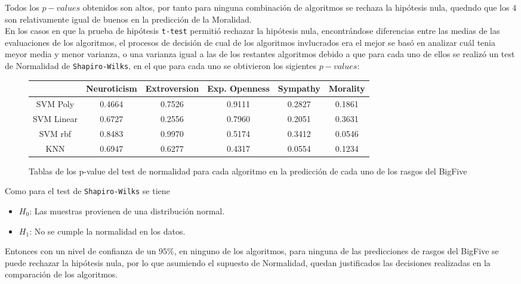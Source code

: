 \documentclass[10pt, a4paper]{article}
\begin{document}
    Todos los $p-values$ obtenidos son altos, por tanto para ninguna combinaci\'on de algoritmos se rechaza la hip\'otesis nula, quedndo 
    que los $4$ son relativamente igual de buenos en la predicci\'on de la Moralidad.\\

    En los casos en que la prueba de hip\'otesis \texttt{t-test} permiti\'o rechazar la hip\'otesis nula, encontr\'andose diferencias entre las medias de las evaluaciones de los algoritmos, el 
    procesos de decisi\'on de cual de los algoritmos invlucrados era el mejor se bas\'o en analizar cu\'al tenia meyor media y menor varianza, o una varianza igual a las de los restantes algoritmos debido 
    a que para cada uno de ellos se realiz\'o un test de Normalidad de \texttt{Shapiro-Wilks}, en el que para cada uno se obtivieron los sigientes $p-values$: 
    
    \begin{figure}[H]
        \centering
        \begin{tabular}{|c|c|c|c|c|c|}
            \cline{2-6}  \multicolumn{1}{c|}{ }  & Neuroticism & Extroversion & Exp. Openness & Sympathy & Morality \\ 
            \hline SVM Poly & 0.4664 & 0.7526 & 0.9111 & 0.2827 & 0.1861 \\ 
            \hline SVM Linear  & 0.6727 & 0.2556 & 0.7960 & 0.2051 & 0.3631\\
            \hline SVM rbf & 0.8483 & 0.9970 & 0.5174 & 0.3412 & 0.0546 \\
            \hline KNN & 0.6947 & 0.6277 & 0.4317 & 0.0554 & 0.1234 \\ 
            \hline 
           
         \end{tabular}
         \caption{Tablas de los p-value del test de normalidad para cada algoritmo en la predicci\'on de cada uno de los rasgos del BigFive}
    \end{figure}

    Como para el test de \texttt{Shapiro-Wilks} se tiene
    
    \begin{itemize}
        \item [] $H_0$: Las muestras provienen de una distribuci\'on normal. 
        \item [] $H_1$: No se cumple la normalidad en los datos.
    \end{itemize}

    Entonces con un nivel de confianza de un $95\%$, en ninguno de los algoritmos, para ninguna de las predicciones de rasgos del BigFive se puede rechazar la hip\'otesis nula, 
    por lo que asumiendo el supuesto de Normalidad, quedan justificados las decisiones realizadas en la comparaci\'on de los algoritmos.
\end{document}

